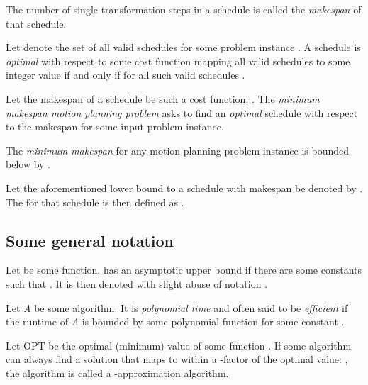 \begin{definition}\label{def:makespan}
	The number of single transformation steps in a schedule is called the \emph{makespan} of that schedule.
\end{definition}

\begin{definition}\label{def:optimality}
	Let \ilmath{\schedules} denote the set of all valid schedules for some problem instance . A schedule  is \emph{optimal} with respect to some cost function  mapping all valid schedules to some integer value if and only if  for all such valid schedules .
\end{definition}

\begin{definition}\label{def:m3pp}
	Let the makespan of a schedule be such a cost function: . The \emph{minimum makespan motion planning problem} asks to find an \emph{optimal} schedule with respect to the makespan  for some input problem instance.
\end{definition}

\begin{remark}
	The \emph{minimum makespan} for any motion planning problem instance  is bounded below by .
\end{remark}

\begin{definition}
	Let the aforementioned lower bound to a schedule with makespan  be denoted by . The  for that schedule is then defined as .
\end{definition}

\subsection{Some general notation}

\begin{definition}
	Let  be some function.  has an asymptotic upper bound  if there are some constants  such that . It is then denoted with slight abuse of notation . 
\end{definition}

Let \emph{A} be some algorithm. It is \emph{polynomial time} and often said to be \emph{efficient} if the runtime of \emph{A} is bounded by some polynomial function  for some constant .

Let OPT be the optimal (minimum) value of some function . If some algorithm  can always find a solution that maps to within a \ilmath{\rho}-factor of the optimal value: , the algorithm is called a \ilmath{\rho}-approximation algorithm. 
